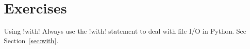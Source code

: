 \documentclass[11pt]{cselabheader}
\begin{document}
%
%
%
%
%
%

\pagebreak
\section{Exercises}
\label{sec:ex}

\begin{warningbox}{Using \protect\pythoninline!with!}
  Always use the \pythoninline!with! statement to deal with file I/O in Python.
  See Section~\ref{sec:with}.
\end{warningbox}
\end{document}
